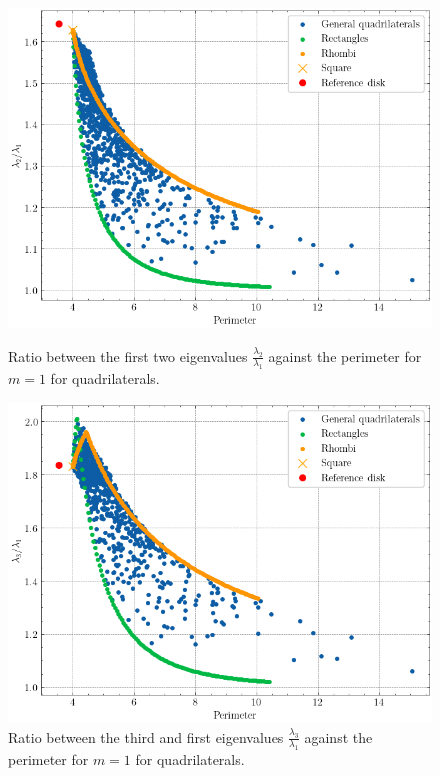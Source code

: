 \begin{figure}[!htb]
    \begin{minipage}[c]{0.45\textwidth}
        \centering
        \includegraphics[width=\textwidth]{Images/Dirac/quad/benguria_quad.png}
        \captionsetup{width=0.8\linewidth} %
        \caption{Ratio between the first two eigenvalues \(\frac{\lambda_2}{\lambda_1}\) against the perimeter for \(m=1\) for quadrilaterals.}
        \label{dirac_benguria_quad}
    \end{minipage}
    \hfill
    \begin{minipage}[c]{0.45\textwidth}
        \centering
        \includegraphics[width=\textwidth]{Images/Dirac/quad/generalized_benguria_quad.png}
        \captionsetup{width=0.8\linewidth} %
        \caption{Ratio between the third and first eigenvalues \(\frac{\lambda_3}{\lambda_1}\) against the perimeter for \(m=1\) for quadrilaterals.}
        \label{dirac_generalized_benguria_quad}
    \end{minipage}
    \vspace{0.5cm}
\end{figure}

